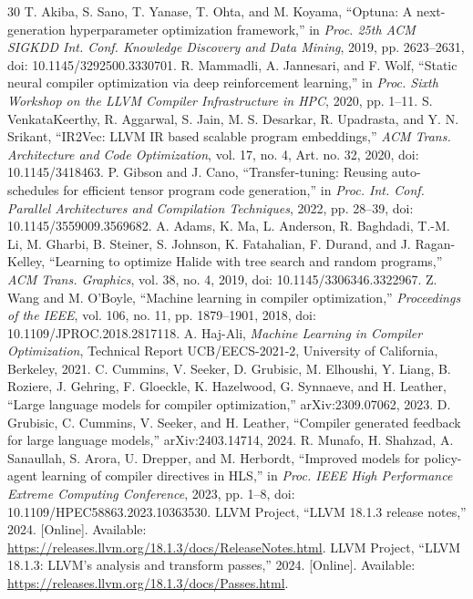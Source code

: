 \begin{thebibliography}{30}
 T. Akiba, S. Sano, T. Yanase, T. Ohta, and M. Koyama, ``Optuna: A next-generation hyperparameter optimization framework,'' in \textit{Proc. 25th ACM SIGKDD Int. Conf. Knowledge Discovery and Data Mining}, 2019, pp. 2623--2631, doi: 10.1145/3292500.3330701.
 R. Mammadli, A. Jannesari, and F. Wolf, ``Static neural compiler optimization via deep reinforcement learning,'' in \textit{Proc. Sixth Workshop on the LLVM Compiler Infrastructure in HPC}, 2020, pp. 1--11.
 S. VenkataKeerthy, R. Aggarwal, S. Jain, M. S. Desarkar, R. Upadrasta, and Y. N. Srikant, ``IR2Vec: LLVM IR based scalable program embeddings,'' \textit{ACM Trans. Architecture and Code Optimization}, vol. 17, no. 4, Art. no. 32, 2020, doi: 10.1145/3418463.
 P. Gibson and J. Cano, ``Transfer-tuning: Reusing auto-schedules for efficient tensor program code generation,'' in \textit{Proc. Int. Conf. Parallel Architectures and Compilation Techniques}, 2022, pp. 28--39, doi: 10.1145/3559009.3569682.
 A. Adams, K. Ma, L. Anderson, R. Baghdadi, T.-M. Li, M. Gharbi, B. Steiner, S. Johnson, K. Fatahalian, F. Durand, and J. Ragan-Kelley, ``Learning to optimize Halide with tree search and random programs,'' \textit{ACM Trans. Graphics}, vol. 38, no. 4, 2019, doi: 10.1145/3306346.3322967.
 Z. Wang and M. O'Boyle, ``Machine learning in compiler optimization,'' \textit{Proceedings of the IEEE}, vol. 106, no. 11, pp. 1879--1901, 2018, doi: 10.1109/JPROC.2018.2817118.
 A. Haj-Ali, \textit{Machine Learning in Compiler Optimization}, Technical Report UCB/EECS-2021-2, University of California, Berkeley, 2021.
 C. Cummins, V. Seeker, D. Grubisic, M. Elhoushi, Y. Liang, B. Roziere, J. Gehring, F. Gloeckle, K. Hazelwood, G. Synnaeve, and H. Leather, ``Large language models for compiler optimization,'' arXiv:2309.07062, 2023.
 D. Grubisic, C. Cummins, V. Seeker, and H. Leather, ``Compiler generated feedback for large language models,'' arXiv:2403.14714, 2024.
 R. Munafo, H. Shahzad, A. Sanaullah, S. Arora, U. Drepper, and M. Herbordt, ``Improved models for policy-agent learning of compiler directives in HLS,'' in \textit{Proc. IEEE High Performance Extreme Computing Conference}, 2023, pp. 1--8, doi: 10.1109/HPEC58863.2023.10363530.
 LLVM Project, ``LLVM 18.1.3 release notes,'' 2024. [Online]. Available: \url{https://releases.llvm.org/18.1.3/docs/ReleaseNotes.html}.
 LLVM Project, ``LLVM 18.1.3: LLVM's analysis and transform passes,'' 2024. [Online]. Available: \url{https://releases.llvm.org/18.1.3/docs/Passes.html}.
\end{thebibliography}
